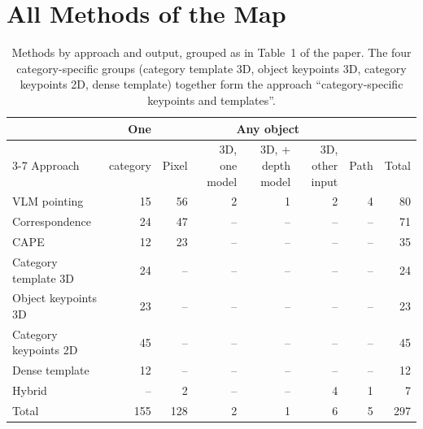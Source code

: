 \section{All Methods of the Map}\label{app:methods}

{\footnotesize\setlength{\tabcolsep}{3pt}
\begin{landscape}
\begin{table}
\caption{Methods by approach and output, grouped as in Table~1 of the paper.
The four category-specific groups (category template 3D, object keypoints 3D, category keypoints 2D, dense template) together form the approach ``category-specific keypoints and templates''.}\label{tab:grouplevel}
\scriptsize
\begin{tabular}{@{}lrrrrrrr@{}}
\toprule
 & One & \multicolumn{5}{c}{Any object} & \\
\cmidrule(lr){3-7}
Approach & category & Pixel & 3D, one model & 3D, + depth model & 3D, other input & Path & Total \\
\midrule
VLM pointing & 15 & 56 & 2 & 1 & 2 & 4 & 80 \\
Correspondence & 24 & 47 & -- & -- & -- & -- & 71 \\
CAPE & 12 & 23 & -- & -- & -- & -- & 35 \\
Category template 3D & 24 & -- & -- & -- & -- & -- & 24 \\
Object keypoints 3D & 23 & -- & -- & -- & -- & -- & 23 \\
Category keypoints 2D & 45 & -- & -- & -- & -- & -- & 45 \\
Dense template & 12 & -- & -- & -- & -- & -- & 12 \\
Hybrid & -- & 2 & -- & -- & 4 & 1 & 7 \\
\midrule
Total & 155 & 128 & 2 & 1 & 6 & 5 & 297 \\
\bottomrule
\end{tabular}


\end{table}
\end{landscape}}
